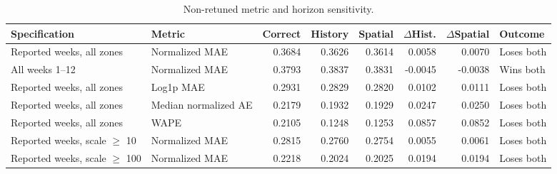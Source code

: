 \begin{table}[H]
\caption{Non-retuned metric and horizon sensitivity.}
\label{tab:tab4_metric_sensitivity}
\scriptsize
\begin{tabular}{llrrrrrl}
\toprule
Specification & Metric & Correct & History & Spatial & $\Delta$Hist. & $\Delta$Spatial & Outcome \\
\midrule
Reported weeks, all zones & Normalized MAE & 0.3684 & 0.3626 & 0.3614 & 0.0058 & 0.0070 & Loses both \\
All weeks 1--12 & Normalized MAE & 0.3793 & 0.3837 & 0.3831 & -0.0045 & -0.0038 & Wins both \\
Reported weeks, all zones & Log1p MAE & 0.2931 & 0.2829 & 0.2820 & 0.0102 & 0.0111 & Loses both \\
Reported weeks, all zones & Median normalized AE & 0.2179 & 0.1932 & 0.1929 & 0.0247 & 0.0250 & Loses both \\
Reported weeks, all zones & WAPE & 0.2105 & 0.1248 & 0.1253 & 0.0857 & 0.0852 & Loses both \\
Reported weeks, scale $\geq$ 10 & Normalized MAE & 0.2815 & 0.2760 & 0.2754 & 0.0055 & 0.0061 & Loses both \\
Reported weeks, scale $\geq$ 100 & Normalized MAE & 0.2218 & 0.2024 & 0.2025 & 0.0194 & 0.0194 & Loses both \\
\bottomrule
\end{tabular}
\end{table}

